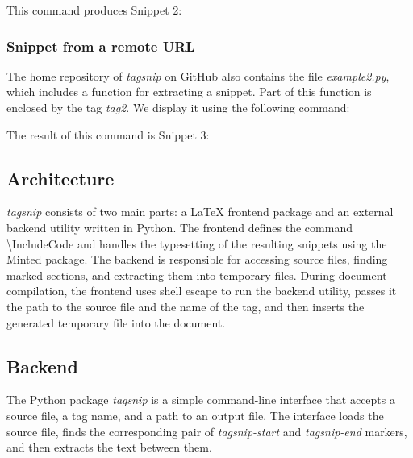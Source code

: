\documentclass{article}
\begin{document}

This command produces Snippet 2:


\newpage

\subsubsection*{Snippet from a remote URL}

The home repository of \textit{tagsnip} on GitHub also contains the file \textit{example2.py}, 
which includes a function for extracting a snippet. 
Part of this function is enclosed by the tag \textit{tag2}. 
We display it using the following command:


The result of this command is Snippet 3:


\subsection*{Architecture}

\textit{tagsnip} consists of two main parts: a \LaTeX{} frontend package and an external backend utility written in Python. 
The frontend defines the command \textbackslash{}IncludeCode and handles the typesetting of the resulting snippets 
using the Minted package. The backend is responsible for accessing source files, finding marked sections, 
and extracting them into temporary files. During document compilation, the frontend uses shell escape 
to run the backend utility, passes it the path to the source file and the name of the tag, 
and then inserts the generated temporary file into the document.

\subsection*{Backend}

The Python package \textit{tagsnip} is a simple command-line interface that accepts a source file, 
a tag name, and a path to an output file. The interface loads the source file, 
finds the corresponding pair of \textit{tagsnip-start} and \textit{tagsnip-end} markers, 
and then extracts the text between them.
\end{document}
